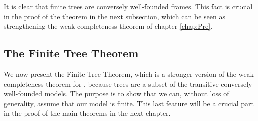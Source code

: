 \documentclass[../main.tex]{subfiles}
\begin{document}
It is clear that finite trees are conversely well-founded frames. This fact is crucial
in the proof of the theorem in the next subsection, which can be seen as strengthening the
weak completeness theorem of chapter \ref{chap:Pre}.

\subsection{The Finite Tree Theorem}
We now present the Finite Tree Theorem, which is a stronger version of the weak completeness
theorem for \GL, because trees are a subset of the transitive conversely well-founded models. 
The purpose is to show that we can, without loss of generality, assume that 
our model is finite. This last feature will be a crucial 
part in the proof of the main theorems in the next chapter. 
\end{document}
